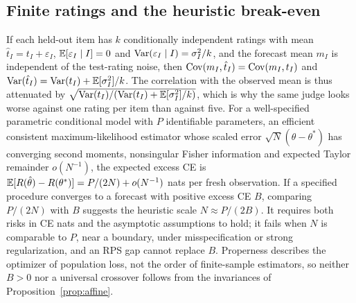 \subsection{Finite ratings and the heuristic break-even}
\label{app:finite}
If each held-out item has $k$ conditionally independent ratings with mean $\hat t_I=t_I+\varepsilon_I$, $\mathbb{E}[\varepsilon_I\mid I]=0$ and $\operatorname{Var}(\varepsilon_I\mid I)=\sigma_I^2/k$, and the forecast mean $m_I$ is independent of the test-rating noise, then $\operatorname{Cov}(m_I,\hat t_I)=\operatorname{Cov}(m_I,t_I)$ and $\operatorname{Var}(\hat t_I)=\operatorname{Var}(t_I)+\mathbb{E}[\sigma_I^2]/k$.
The correlation with the observed mean is thus attenuated by $\sqrt{\operatorname{Var}(t_I)/(\operatorname{Var}(t_I)+\mathbb{E}[\sigma_I^2]/k)}$, which is why the same judge looks worse against one rating per item than against five.
For a well-specified parametric conditional model with $P$ identifiable parameters, an efficient consistent maximum-likelihood estimator whose scaled error $\sqrt N(\hat\theta-\theta^\ast)$ has converging second moments, nonsingular Fisher information and expected Taylor remainder $o(N^{-1})$, the expected excess CE is $\mathbb{E}[R(\hat\theta)-R(\theta^\ast)]=P/(2N)+o(N^{-1})$ nats per fresh observation.
If a specified procedure converges to a forecast with positive excess CE $B$, comparing $P/(2N)$ with $B$ suggests the heuristic scale $N\approx P/(2B)$.
It requires both risks in CE nats and the asymptotic assumptions to hold; it fails when $N$ is comparable to $P$, near a boundary, under misspecification or strong regularization, and an RPS gap cannot replace $B$.
Properness describes the optimizer of population loss, not the order of finite-sample estimators, so neither $B>0$ nor a universal crossover follows from the invariances of Proposition~\ref{prop:affine}.
